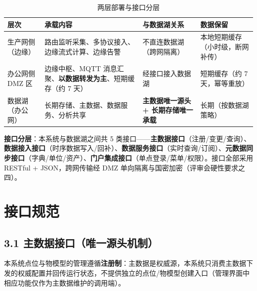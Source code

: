 \documentclass[11pt,a4paper]{ctexart}
\begin{document}
\begin{table}[H]\centering
\caption{两层部署与接口分层}
\begin{tabular}{p{3.2cm} p{3.6cm} p{3.0cm} p{3.2cm}}
\toprule
\textbf{层次} & \textbf{承载内容} & \textbf{与数据湖关系} & \textbf{数据保留} \\
\midrule
生产网侧（边缘） & 路由监听采集、多协议接入、边缘流式计算、边缘告警 & 不直连数据湖（跨网隔离） & 本地短期缓存（小时级，断网补传） \\
办公网侧 DMZ 区 & 边缘中枢、MQTT 消息汇聚、\textbf{以数据转发为主}、短期缓存（约 7 天） & 经接口接入数据湖 & 短期缓存（约 7 天，幂等重放） \\
数据湖（办公网） & 长期存储、主数据、数据服务、分析共享 & \textbf{主数据唯一源头 + 长期存储唯一承载} & 长期（按数据湖策略） \\
\bottomrule
\end{tabular}
\end{table}

\textbf{接口分层}：本系统与数据湖之间共 5 类接口——\textbf{主数据接口}（注册/变更/查询）、\textbf{数据接入接口}（时序数据写入/回补）、\textbf{数据服务接口}（实时查询/订阅）、\textbf{元数据同步接口}（字典/单位/资产）、\textbf{门户集成接口}（单点登录/菜单/权限）。接口全部采用 RESTful + JSON，跨网传输经 DMZ 单向隔离与国密加密（评审会硬性要求之四）。

\section{接口规范}

\subsection{3.1 主数据接口（唯一源头机制）}

本系统点位与物模型的管理遵循\textbf{注册制}：主数据是权威源，本系统只消费主数据下发的权威配置并回传运行状态，不提供独立的点位/物模型创建入口（管理界面中相应功能仅作为主数据维护的调用端）。
\end{document}
